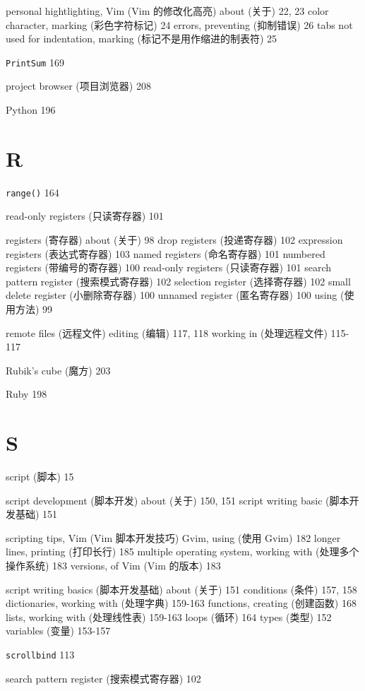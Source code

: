 personal hightlighting, Vim (Vim 的修改化高亮)
  about (关于) 22, 23
  color character, marking (彩色字符标记) 24
  errors, preventing (抑制错误) 26
  tabs not used for indentation, marking (标记不是用作缩进的制表符) 25

\texttt{PrintSum} 169

project browser (项目浏览器) 208

Python 196

\section{R}

\texttt{range()} 164

read-only registers (只读寄存器) 101

registers (寄存器)
  about (关于) 98
  drop registers (投递寄存器) 102
  expression registers (表达式寄存器) 103
  named registers (命名寄存器) 101
  numbered registers (带编号的寄存器) 100
  read-only registers (只读寄存器) 101
  search pattern register (搜索模式寄存器) 102
  selection register (选择寄存器) 102
  small delete register (小删除寄存器) 100
  unnamed register (匿名寄存器) 100
  using (使用方法) 99

remote files (远程文件)
  editing (编辑) 117, 118
  working in (处理远程文件) 115-117

Rubik's cube (魔方) 203

Ruby 198

\section{S}

script (脚本) 15

script development (脚本开发)
  about (关于) 150, 151
  script writing basic (脚本开发基础) 151

scripting tips, Vim (Vim 脚本开发技巧)
  Gvim, using (使用 Gvim) 182
  longer lines, printing (打印长行) 185
  multiple operating system, working with (处理多个操作系统) 183
  versions, of Vim (Vim 的版本) 183

script writing basics (脚本开发基础)
  about (关于) 151
  conditions (条件) 157, 158
  dictionaries, working with (处理字典) 159-163
  functions, creating (创建函数) 168
  lists, working with (处理线性表) 159-163
  loops (循环) 164
  types (类型) 152
  variables (变量) 153-157

\texttt{scrollbind} 113

search pattern register (搜索模式寄存器) 102

